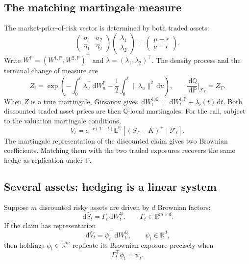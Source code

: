 \documentclass[10pt]{article}
\newcommand{\E}{\mathbb E}
\newcommand{\Pp}{\mathbb P}
\newcommand{\Q}{\mathbb Q}
\newcommand{\R}{\mathbb R}
\newcommand{\1}{\mathbf 1}
\newcommand{\cF}{\mathcal F}
\newcommand{\dd}{\,\mathrm d}
\theoremstyle{definition}
\begin{document}
\subsection{The matching martingale measure}

The market-price-of-risk vector is determined by both traded assets:
\[
\begin{pmatrix}\sigma_1&\sigma_2\\\eta_1&\eta_2\end{pmatrix}
\begin{pmatrix}\lambda_1\\\lambda_2\end{pmatrix}
=\begin{pmatrix}\mu-r\\\nu-r\end{pmatrix}.
\]
Write \(W^\Pp=(W^{1,\Pp},W^{2,\Pp})^\top\) and
\(\lambda=(\lambda_1,\lambda_2)^\top\). The density process and the
terminal change of measure are
\[
\boxed{Z_t=\exp\!\left(-\int_0^t\lambda_u^\top\dd W_u^\Pp
-\frac12\int_0^t\|\lambda_u\|^2\dd u\right),\qquad
\frac{\dd\Q}{\dd\Pp}\bigg|_{\cF_T}=Z_T.}
\]
When \(Z\) is a true martingale, Girsanov gives
\(\dd W_t^{i,\Q}=\dd W_t^{i,\Pp}+\lambda_i(t)\dd t\).
Both discounted traded asset prices are then \(\Q\)-local martingales.
For the call, subject to the valuation martingale conditions,
\[
V_t=e^{-r(T-t)}\E^\Q[(S_T-K)^+\mid\cF_t].
\]
The martingale representation of the discounted claim gives two Brownian
coefficients. Matching them with the two traded exposures recovers the
same hedge as replication under \(\Pp\).

\subsection{Several assets: hedging is a linear system}

Suppose \(m\) discounted risky assets are driven by \(d\) Brownian factors:
\[
\dd\bar S_t=\Gamma_t\dd W_t^\Q,
\qquad
\Gamma_t\in\R^{m\times d}.
\]
If the claim has representation
\[
\dd\bar V_t=\psi_t^\top\dd W_t^\Q,
\qquad \psi_t\in\R^d,
\]
then holdings \(\phi_t\in\R^m\) replicate its Brownian exposure precisely
when
\[
\boxed{\Gamma_t^\top\phi_t=\psi_t.}
\]
\end{document}
